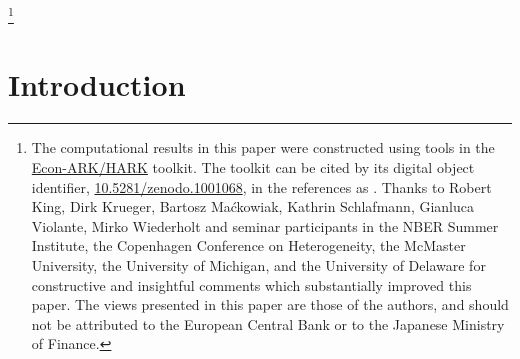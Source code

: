 \documentclass[titlepage]{\econtex}\newcommand{\texname}{cAndCwithStickyE}
\begin{document}
\begin{authorsinfo}
\end{authorsinfo}
\thanks{The computational results in this paper were constructed using tools in the \href{http://github.com/Econ-ARK/HARK}{Econ-ARK/HARK} toolkit.  The toolkit can be cited by its digital object identifier, \href{https://doi.org/10.5281/zenodo.1001068}{10.5281/zenodo.1001068}, in the references as \cite{matthew_n_white_2017_1001068}.  Thanks to Robert King, Dirk Krueger, Bartosz Ma\'ckowiak, Kathrin Schlafmann, Gianluca Violante, Mirko Wiederholt and seminar participants in the NBER Summer Institute, the Copenhagen Conference on Heterogeneity, the McMaster University, the University of Michigan, and the University of Delaware for constructive and insightful comments which substantially improved this paper. The views presented in this paper are those of the authors, and should not be attributed to the European Central Bank or to the Japanese Ministry of Finance.}

\titlepagefinish
\setcounter{page}{1}

\pagebreak


\section{Introduction}

\end{document}
